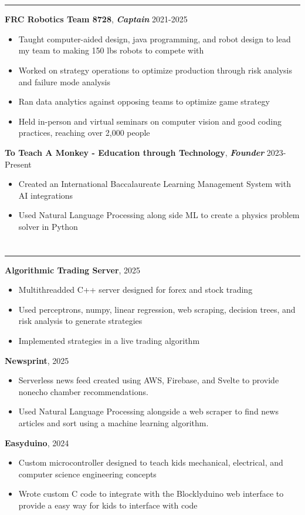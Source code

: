 \documentclass{article}[11pt]
\newcommand{\underlinedsection}[1]{ \section*{\sc{#1}}
	\rule{\textwidth}{1pt} }
\newenvironment{denseitemize} %
{ \begin{itemize}[leftmargin = 20pt, topsep = 0pt, itemsep = 0pt] }
{\end{itemize} }
\newcommand{\job}[3]{ {\textbf{#1}, \textit{\textbf{#2}} \hfill {#3}} }
\begin{document}
\underlinedsection{Other experience}
\job{FRC Robotics Team 8728}{Captain}{2021-2025}
\begin{denseitemize}
	\item Taught computer-aided design, java programming, and robot design to lead my team to making 150 lbs robots to compete with
    \item Worked on strategy operations to optimize production through risk analysis and failure mode analysis
    \item Ran data analytics against opposing teams to optimize game strategy
    \item Held in-person and virtual seminars on computer vision and good coding practices, reaching over 2,000 people
\end{denseitemize}
\job{To Teach A Monkey - Education through Technology}{Founder}{2023-Present}
\begin{denseitemize}
	\item Created an International Baccalaureate Learning Management System with AI integrations
    \item Used Natural Language Processing along side ML to create a physics problem solver in Python
    
    
\end{denseitemize}
\underlinedsection{Projects}
\job{Algorithmic Trading Server}{}{2025}
\begin{denseitemize}
	\item Multithreadded C++ server designed for forex and stock trading 
    \item Used perceptrons, numpy, linear regression, web scraping, decision trees, and risk analysis to generate strategies
    \item Implemented strategies in a live trading algorithm  
\end{denseitemize}
\job{Newsprint}{}{2025}
\begin{denseitemize}
	\item Serverless news feed created using AWS, Firebase, and Svelte to provide nonecho chamber recommendations.
    \item Used Natural Language Processing alongside a web scraper to find news articles and sort using a machine learning algorithm.
\end{denseitemize}
\job{Easyduino}{}{2024}
\begin{denseitemize}
	\item Custom microcontroller designed to teach kids mechanical, electrical, and computer science engineering concepts
    \item Wrote custom C code to integrate with the Blocklyduino web interface to provide a easy way for kids to interface with code
\end{denseitemize}


\thispagestyle{empty}
\end{document}

